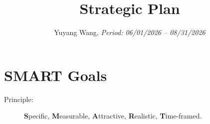 \documentclass[custom, sidenote, final]{cls/oneproposal}
\title{Strategic Plan}
\author{Yuyang Wang, \emph{Period: 06/01/2026 -- 08/31/2026}}
\begin{document}







\maketitledescription

\section{SMART Goals}
\begin{description}
    \item[Principle:] \textbf{S}pecific, \textbf{M}easurable, \textbf{A}ttractive, \textbf{R}ealistic, \textbf{T}ime-framed.
\end{description}
\end{document}
